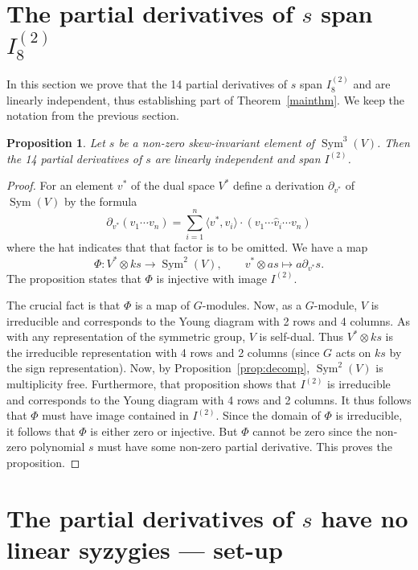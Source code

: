 \documentclass{amsart}
\newtheorem{proposition}[theorem]{Proposition}
\theoremstyle{definition}
\theoremstyle{remark}
\DeclareMathOperator{\Sym}{Sym}
\begin{document}
\section{The partial derivatives of $s$ span $I_8^{(2)}$}

In this section we prove that the 14 partial derivatives of $s$ span
$I_8^{(2)}$ and are linearly independent, thus establishing part of
Theorem~\ref{mainthm}.  We keep the notation from the previous section.

\begin{proposition}
\label{prop:quad}
Let $s$ be a non-zero skew-invariant element of $\Sym^3(V)$.  Then the 14
partial derivatives of $s$ are linearly independent and span $I^{(2)}$.
\end{proposition}

\begin{proof}
For an element $v^*$ of the dual space $V^*$ define a derivation
$\partial_{v^*}$ of $\Sym(V)$ by the formula
\begin{displaymath}
\partial_{v^*}(v_1 \cdots v_n)=\sum_{i=1}^n \langle v^*, v_i \rangle \cdot
(v_1 \cdots \hat{v}_i \cdots v_n)
\end{displaymath}
where the hat indicates that that factor is to be omitted.  We have a map
\begin{displaymath}
\Phi : V^* \otimes ks \to \Sym^2(V), \qquad v^* \otimes as \mapsto a
\partial_{v^*} s.
\end{displaymath}
The proposition states that $\Phi$ is injective with image $I^{(2)}$.

The crucial fact is that $\Phi$ is a map of $G$-modules.  Now, as a
$G$-module, $V$ is irreducible and corresponds to the Young diagram with
2 rows and 4 columns.  As with any representation of the symmetric group,
$V$ is self-dual.  Thus $V^* \otimes ks$ is the irreducible representation
with 4 rows and 2 columns (since $G$ acts on $ks$ by the sign representation).
Now, by Proposition~\ref{prop:decomp}, $\Sym^2(V)$ is multiplicity free.
Furthermore, that proposition shows that $I^{(2)}$ is irreducible and
corresponds to the Young diagram with 4 rows and 2 columns.  It thus follows
that $\Phi$ must have image contained in $I^{(2)}$.  Since the domain of
$\Phi$ is irreducible, it follows that $\Phi$ is either zero or injective.
But $\Phi$ cannot be zero since the non-zero polynomial $s$ must have some
non-zero partial derivative.  This proves the proposition.
\end{proof}


\section{The partial derivatives of $s$ have no linear syzygies --- set-up}
\end{document}
